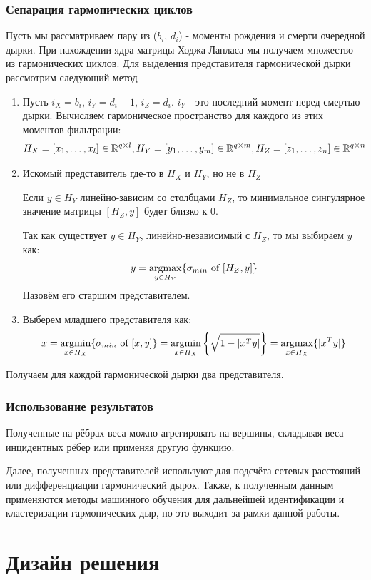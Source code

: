 \documentclass{article}
\begin{document}
\subsubsection{Сепарация гармонических циклов}
Пусть мы рассматриваем пару из ($b_i$, $d_i$) - моменты рождения и смерти очередной дырки. При нахождении ядра матрицы Ходжа-Лапласа мы получаем множество из гармонических циклов. Для выделения представителя гармонической дырки рассмотрим следующий метод
\begin{enumerate}
  \item Пусть $i_X = b_i$, $i_Y = d_i - 1$, $i_Z = d_i$. $i_Y$ - это последний момент перед смертью дырки. Вычисляем гармоническое пространство для каждого из этих моментов фильтрации:
    \[H_X = [x_1,\dots,x_l]\in\R^{q\times l},\q H_Y = [y_1,\dots,y_m]\in\R^{q\times m},\q H_Z = [z_1,\dots,z_n]\in\R^{q\times n}\]
  \item Искомый представитель где-то в $H_X$ и $H_Y$, но не в $H_Z$
    \begin{lemma}
      Если $y\in H_Y$ линейно-зависим со столбцами $H_Z$, то минимальное сингулярное значение матрицы $[H_Z,y]$ будет близко к 0.
    \end{lemma}
    Так как существует $y\in H_Y$, линейно-независимый с $H_Z$, то мы выбираем $y$ как: 
    \[ y = \mathop{\rm argmax}\limits_{y\in H_Y}\{\sigma_{min} \text { of } [H_Z,y]\}\]
    Назовём его старшим представителем.

  \item Выберем младшего представителя как:
    \[x = \mathop{\rm argmin}\limits_{x\in H_X}\{\sigma_{min} \text { of } [x,y]\} = \mathop{\rm argmin}\limits_{x\in H_X}\left\{\sqrt{1 - |x^Ty|}\right\} = \mathop{\rm argmax}\limits_{x\in H_X}\{|x^Ty|\}\]
\end{enumerate}
Получаем для каждой гармонической дырки два представителя.
\subsubsection{Использование результатов}
Полученные на рёбрах веса можно агрегировать на вершины, складывая веса инцидентных рёбер или применяя другую функцию.

Далее, полученных представителей используют для подсчёта сетевых расстояний или дифференциации гармонический дырок. Также, к полученным данным применяются методы машинного обучения для дальнейшей идентификации и кластеризации гармонических дыр, но это выходит за рамки данной работы.
\section{Дизайн решения}
\end{document}
